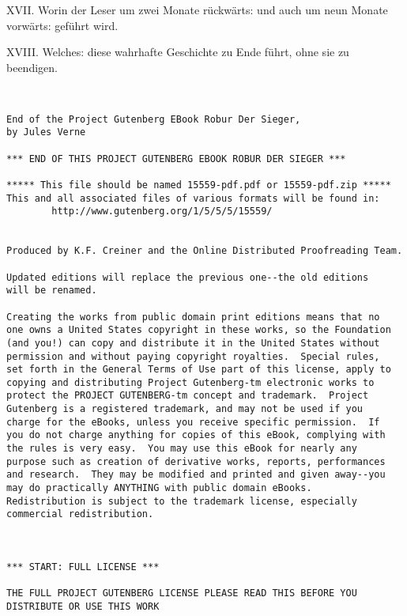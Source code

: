 \documentclass[oneside,12pt]{book}
\newenvironment{antiqua}{\normalfont}{}
\newcommand{\s}{s:}
\begin{document}
\begin{antiqua}XVII.\end{antiqua} Worin der Leser um zwei Monate
r\"uckw\"art{\s} und auch um neun Monate vorw\"art{\s} gef\"uhrt
wird.~\dotfill\pageref{kap17}

\begin{antiqua}XVIII.\end{antiqua} Welche{\s} diese wahrhafte
Geschichte zu Ende f\"uhrt, ohne sie zu
beendigen.~\dotfill\pageref{kap18}

\newpage

\small {}
\begin{verbatim}


End of the Project Gutenberg EBook Robur Der Sieger,
by Jules Verne

*** END OF THIS PROJECT GUTENBERG EBOOK ROBUR DER SIEGER ***

***** This file should be named 15559-pdf.pdf or 15559-pdf.zip *****
This and all associated files of various formats will be found in:
        http://www.gutenberg.org/1/5/5/5/15559/


Produced by K.F. Creiner and the Online Distributed Proofreading Team.

Updated editions will replace the previous one--the old editions
will be renamed.

Creating the works from public domain print editions means that no
one owns a United States copyright in these works, so the Foundation
(and you!) can copy and distribute it in the United States without
permission and without paying copyright royalties.  Special rules,
set forth in the General Terms of Use part of this license, apply to
copying and distributing Project Gutenberg-tm electronic works to
protect the PROJECT GUTENBERG-tm concept and trademark.  Project
Gutenberg is a registered trademark, and may not be used if you
charge for the eBooks, unless you receive specific permission.  If
you do not charge anything for copies of this eBook, complying with
the rules is very easy.  You may use this eBook for nearly any
purpose such as creation of derivative works, reports, performances
and research.  They may be modified and printed and given away--you
may do practically ANYTHING with public domain eBooks.
Redistribution is subject to the trademark license, especially
commercial redistribution.



*** START: FULL LICENSE ***

THE FULL PROJECT GUTENBERG LICENSE PLEASE READ THIS BEFORE YOU
DISTRIBUTE OR USE THIS WORK


\end{verbatim}
\end{document}
